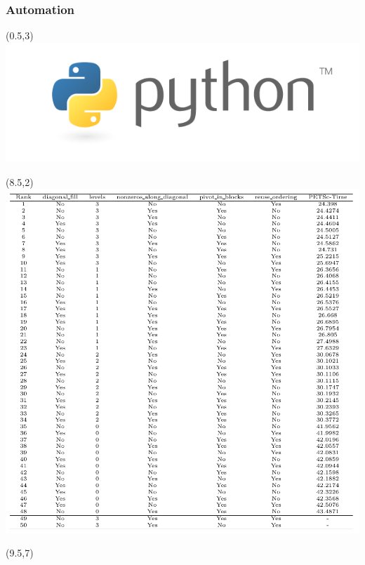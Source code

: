 \documentclass[11pt]{beamer}
\begin{document}
\begin{frame}
  \frametitle{Automation}
  \begin{textblock}{8}(0.5,3)
    \includegraphics[width=\textwidth]{petsc/python-logo}\\
  \end{textblock}

  \begin{textblock}{6}(8.5,2)
    \includegraphics[width=\textwidth]{petsc/options-1x1}
  \end{textblock}
  \begin{textblock}{6}(9.5,7)

\end{textblock}
\end{frame}
\end{document}
